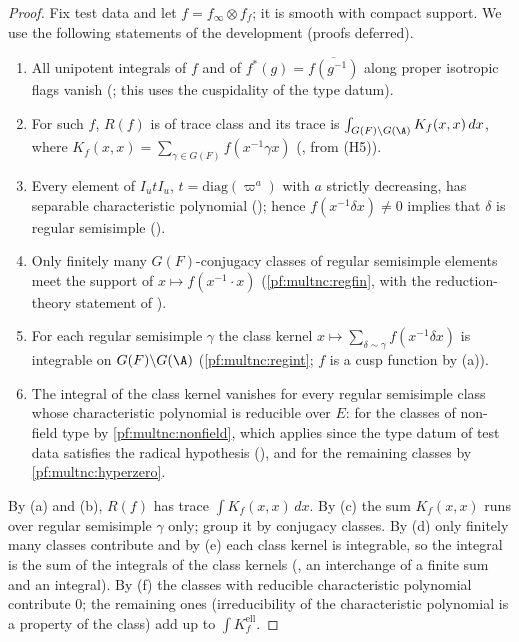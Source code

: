 \begin{proof}
Fix test data and let $f=f_\infty\otimes f_f$; it is smooth with compact support. We use the following statements of the
development (proofs deferred).
\begin{enumerate}[label=(\alph*)]
\item All unipotent integrals of $f$ and of $f^*(g)=\overline{f(g^{-1})}$ along proper isotropic flags vanish
(; this uses the cuspidality of the type datum).
\item For such $f$, $R(f)$ is of trace class and its trace is $\int_{G(F)\backslash G(\A)}K_f(x,x)\,dx$, where
$K_f(x,x)=\sum_{\gamma\in G(F)}f(x^{-1}\gamma x)$ (,
from (H5)).
\item Every element of $I_utI_u$, $t=\mathrm{diag}(\varpi^a)$ with $a$ strictly decreasing, has separable characteristic
polynomial (); hence $f(x^{-1}\delta x)\ne0$ implies that
$\delta$ is regular semisimple ().
\item Only finitely many $G(F)$-conjugacy classes of regular semisimple elements meet the support of
$x\mapsto f(x^{-1}\cdot x)$ (\cref{pf:multnc:regfin}, with the reduction-theory statement of
).
\item For each regular semisimple $\gamma$ the class kernel $x\mapsto\sum_{\delta\sim\gamma}f(x^{-1}\delta x)$ is integrable
on $G(F)\backslash G(\A)$ (\cref{pf:multnc:regint}; $f$ is a cusp function by (a)).
\item The integral of the class kernel vanishes for every regular semisimple class whose characteristic polynomial is
reducible over $E$: for the classes of non-field type by \cref{pf:multnc:nonfield}, which applies since the type datum of
test data satisfies the radical hypothesis (), and for the remaining
classes by \cref{pf:multnc:hyperzero}.
\end{enumerate}
By (a) and (b), $R(f)$ has trace $\int K_f(x,x)\,dx$. By (c) the sum $K_f(x,x)$ runs over regular semisimple $\gamma$
only; group it by conjugacy classes. By (d) only finitely many classes contribute and by (e) each class kernel is
integrable, so the integral is the sum of the integrals of the class kernels
(, an interchange of a finite sum and an integral).
By (f) the classes with reducible characteristic polynomial contribute $0$; the remaining ones (irreducibility of the
characteristic polynomial is a property of the class) add up to $\int K^{\mathrm{ell}}_f$.
\end{proof}


